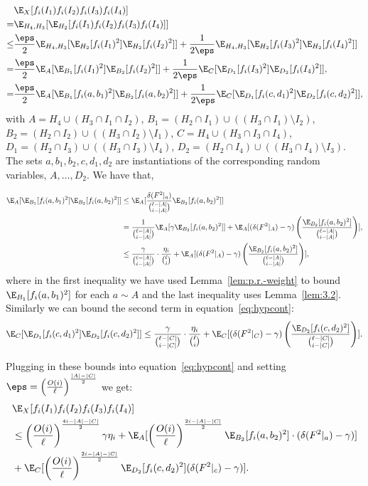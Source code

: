 \begin{align}
&\E_X[f_i(I_1)f_i(I_2)f_i(I_3)f_i(I_4)] \nonumber \\
= &\E_{H_4,H_3} [\E_{H_2}[f_i(I_1)f_i(I_2)f_i(I_3)f_i(I_4)]]\nonumber \\
\leq &\frac{\eps}{2}\E_{H_4,H_3}[\E_{H_2}[f_i(I_1)^2]\E_{H_2}[f_i(I_2)^2]] +  \frac{1}{2\eps}\E_{H_4,H_3}[\E_{H_2}[f_i(I_3)^2]\E_{H_2}[f_i(I_4)^2]]\nonumber\\
= &\frac{\eps}{2}\E_{A}[\E_{B_1}[f_i(I_1)^2]\E_{B_2}[f_i(I_2)^2]] +  \frac{1}{2\eps}\E_{C}[\E_{D_1}[f_i(I_3)^2]\E_{D_2}[f_i(I_4)^2]],\nonumber\\
= &\frac{\eps}{2}\E_{A}[\E_{B_1}[f_i(a, b_1)^2]\E_{B_2}[f_i(a, b_2)^2]] +  \frac{1}{2\eps}\E_{C}[\E_{D_1}[f_i(c,d_1)^2]\E_{D_2}[f_i(c,d_2)^2]],\label{eq:hypcont}
\end{align}
with $A = H_4 \cup (H_3 \cap I_1 \cap I_2)$, 
$B_1 = (H_2 \cap I_1) \cup ((H_3 \cap I_1) \setminus I_2)$,
$B_2 = (H_2 \cap I_2) \cup ((H_3 \cap I_2) \setminus I_1)$, $C = H_4 \cup (H_3 \cap I_3 \cap I_4)$, $D_1 = (H_2 \cap I_3) \cup ((H_3 \cap I_3) \setminus I_4)$,
$D_2 = (H_2 \cap I_4) \cup ((H_3 \cap I_4) \setminus I_3)$. The sets $a,b_1,b_2,c,d_1,d_2$ are instantiations of the corresponding random variables, $A, \ldots,D_2$. We have that,

\begin{align*}
\E_{A}[\E_{B_1}[f_i(a, b_1)^2]\E_{B_2}[f_i(a, b_2)^2]] &\leq \E_{A}[\frac{\delta(F^{ 2}|_a)}{{\ell-|A| \choose i - |A|}}\E_{B_2}[f_i(a,b_2)^2]] \\
&= \frac{1}{{\ell-|A| \choose i - |A|}}\E_{A}[\gamma \E_{B_2}[f_i(a,b_2)^2]] + \E_A[(\delta(F^{ 2}|_A) - \gamma)\left(\frac{\E_{B_2}[f_i(a,b_2)^2]}{{\ell-|A| \choose i - |A|}}\right)],\\
&\leq \frac{\gamma}{{\ell-|A| \choose i - |A|}}\cdot \frac{\eta_i}{{\ell \choose i}} + \E_A[(\delta(F^{2}|_A) - \gamma)\left(\frac{\E_{B_2}[f_i(a,b_2)^2]}{{\ell-|A| \choose i - |A|}}\right)],
\end{align*}
where in the first inequality we have used Lemma~\ref{lem:p.r.-weight} to bound $\E_{B_1}[f_i(a,b_1)^2]$ for each $a \sim A$ and the last inequality uses Lemma~\ref{lem:3.2}. Similarly we can bound the second term in equation~\eqref{eq:hypcont}:
\[\E_{C}[\E_{D_1}[f_i(c,d_1)^2]\E_{D_2}[f_i(c,d_2)^2]] \leq \frac{\gamma}{{\ell-|C| \choose i - |C|}}\cdot \frac{\eta_i}{{\ell \choose i}} + \E_C[(\delta(F^{2}|_C) - \gamma)\left(\frac{\E_{D_2}[f_i(c,d_2)^2]}{{\ell-|C| \choose i - |C|}}\right)].\]

Plugging in these bounds into equation~\eqref{eq:hypcont} and setting $\eps = \left(\frac{O(i)}{\ell}\right)^{\frac{|A|-|C|}{2}}$ we get:
\begin{align*}
&\E_X[f_i(I_1)f_i(I_2)f_i(I_3)f_i(I_4)] \\
&\leq \left(\frac{O(i)}{\ell}\right)^{\frac{4i - |A|-|C|}{2}}\gamma\eta_i + \E_A[ \left(\frac{O(i)}{\ell}\right)^{\frac{2i-|A|-|C|}{2}}\E_{B_2}[f_i(a,b_2)^2]\cdot (\delta(F^{ 2}|_a) - \gamma)]  \\ 
&+\E_C[\left(\frac{O(i)}{\ell}\right)^{\frac{2i-|A|-|C|}{2}}\E_{D_2}[f_i(c,d_2)^2](\delta(F^{ 2}|_c) - \gamma)]. 
\end{align*}

